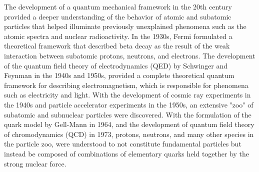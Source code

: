 The development of a quantum mechanical framework in the 20th century provided a deeper understanding of the behavior of atomic and subatomic particles that helped illuminate previously unexplained phenomena such as the atomic spectra and nuclear radioactivity.
In the 1930s, Fermi formulated a theoretical framework that described beta decay as the result of the weak interaction between subatomic protons, neutrons, and electrons.
The development of the quantum field theory of electrodynamics (QED) by Schwinger and Feynman in the 1940s and 1950s, provided a complete theoretical quantum framework for describing electromagnetism, which is responsible for phenomena such as electricity and light.
With the development of cosmic ray experiments in the 1940s and particle accelerator experiments in the 1950s, an extensive "zoo" of subatomic and subnuclear particles were discovered.
With the formulation of the quark model by Gell-Mann in 1964, and the development of quantum field theory of chromodynamics (QCD) in 1973, protons, neutrons, and many other species in the particle zoo, were understood to not constitute fundamental particles but instead be composed of combinations of elementary quarks held together by the strong nuclear force.

